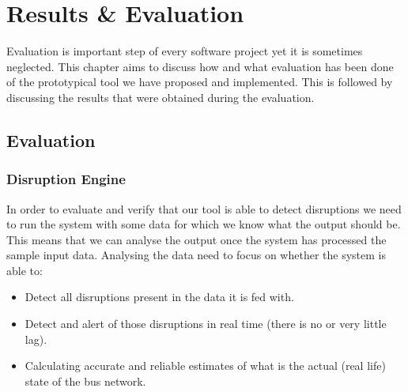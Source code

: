 \chapter{Results \& Evaluation}
Evaluation is important step of every software project yet it is sometimes neglected. This chapter aims to discuss how and what evaluation has been done of the prototypical tool we have proposed and implemented. This is followed by discussing the results that were obtained during the evaluation.

\section{Evaluation}

\subsection{Disruption Engine}
In order to evaluate and verify that our tool is able to detect disruptions we need to run the system with some data for which we know what the output should be. This means that we can analyse the output once the system has processed the sample input data. Analysing the data need to focus on whether the system is able to:
\begin{itemize}
	\item Detect all disruptions present in the data it is fed with.
	\item Detect and alert of those disruptions in real time (there is no or very little lag).
	\item Calculating accurate and reliable estimates of what is the actual (real life) state of the bus network.
\end{itemize}

